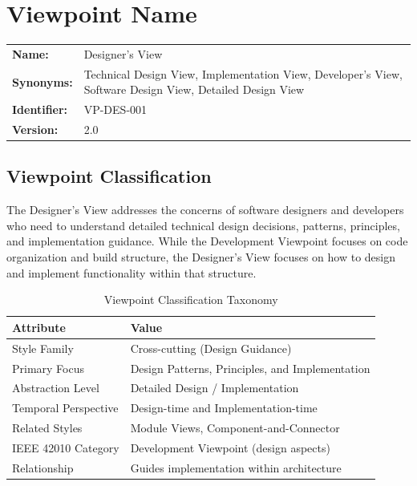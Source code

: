 \documentclass[11pt,letterpaper]{article}
\begin{document}
\section{Viewpoint Name}

\begin{definitionbox}
\begin{tabular}{@{}L{3.5cm}L{10cm}@{}}
\textbf{Name:} & Designer's View \\[0.5em]
\textbf{Synonyms:} & Technical Design View, Implementation View, Developer's View, Software Design View, Detailed Design View \\[0.5em]
\textbf{Identifier:} & VP-DES-001 \\[0.5em]
\textbf{Version:} & 2.0 \\
\end{tabular}
\end{definitionbox}

\subsection{Viewpoint Classification}

The Designer's View addresses the concerns of software designers and developers who need to understand detailed technical design decisions, patterns, principles, and implementation guidance. While the Development Viewpoint focuses on code organization and build structure, the Designer's View focuses on how to design and implement functionality within that structure.

\begin{table}[H]
\centering
\caption{Viewpoint Classification Taxonomy}
\begin{tabular}{@{}L{4cm}L{10cm}@{}}
\toprule
\textbf{Attribute} & \textbf{Value} \\
\midrule
Style Family & Cross-cutting (Design Guidance) \\
Primary Focus & Design Patterns, Principles, and Implementation \\
Abstraction Level & Detailed Design / Implementation \\
Temporal Perspective & Design-time and Implementation-time \\
Related Styles & Module Views, Component-and-Connector \\
IEEE 42010 Category & Development Viewpoint (design aspects) \\
Relationship & Guides implementation within architecture \\
\bottomrule
\end{tabular}
\end{table}
\end{document}
